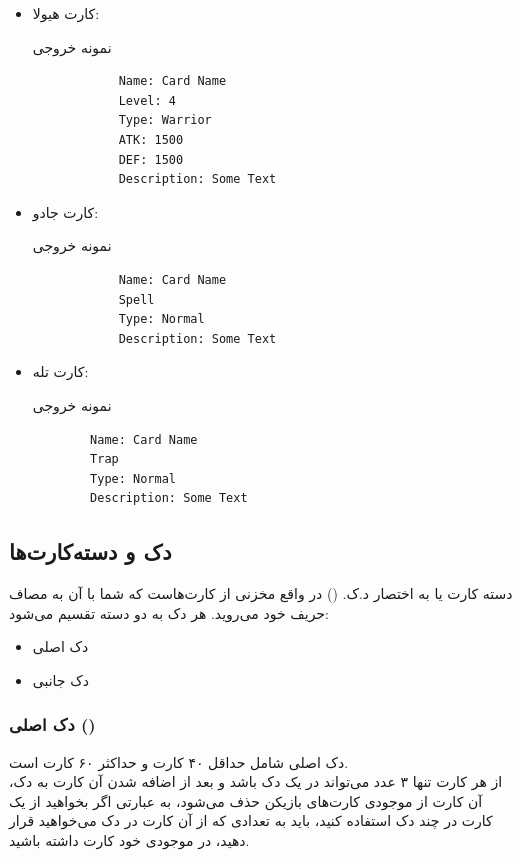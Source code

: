 \documentclass[]{article}
\begin{document}
\begin{itemize}
	\item کارت هیولا:
\begin{mybox}[colback=yellow]{نمونه خروجی}
	\begin{latin}	
		\begin{verbatim}
			Name: Card Name
			Level: 4
			Type: Warrior
			ATK: 1500
			DEF: 1500
			Description: Some Text
		\end{verbatim}
	\end{latin}
\end{mybox}	
	
	
		\item کارت جادو:
	\begin{mybox}[colback=yellow]{نمونه خروجی}
		\begin{latin}	
			\begin{verbatim}
			Name: Card Name
			Spell
			Type: Normal
			Description: Some Text
				\end{verbatim}
		\end{latin}
	\end{mybox}	


	\item کارت تله:
\begin{mybox}[colback=yellow]{نمونه خروجی}
	\begin{latin}	
		\begin{verbatim}
		Name: Card Name
		Trap
		Type: Normal
		Description: Some Text
			\end{verbatim}
	\end{latin}
\end{mybox}	
	
\end{itemize}




\subsection*{{\titr دک و دسته‌کارت‌ها}}
دسته کارت یا به اختصار د.ک. () در واقع مخزنی از کارت‌هاست که شما با 
آن به مصاف حریف خود می‌روید. هر دک به دو دسته تقسیم می‌شود:
\begin{itemize}
	\item
	دک اصلی
	\item
	دک جانبی
\end{itemize}

\subsubsection*{{\titr دک اصلی ()}}
دک اصلی شامل حداقل ۴۰ کارت و حداکثر ۶۰ کارت است. 
\\
از هر کارت تنها ۳ عدد می‌تواند در یک دک باشد و بعد از اضافه شدن آن کارت به 
دک، آن کارت از موجودی کارت‌های بازیکن حذف می‌شود، به عبارتی اگر بخواهید از یک 
کارت در چند دک استفاده کنید، باید به تعدادی که از آن کارت در دک می‌خواهید 
قرار دهید، در موجودی خود کارت داشته باشید.
\end{document}
